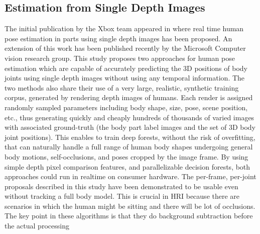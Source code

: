 \subsection{Estimation from Single Depth Images}
 The initial publication by the Xbox\cite{Kinect2014} team appeared in \cite{shotton2013real} where real time human pose estimation in parts using single depth images has been proposed. An extension of this work has been published recently by the Microsoft Computer vision research group\cite{shotton2013efficient}. This study proposes two approaches for human pose estimation which are capable of accurately predicting the 3D positions of body joints using single depth images without using any temporal information. The two methods also share their use of a very large, realistic, synthetic training corpus, generated by rendering depth images of humans. Each render is assigned randomly sampled parameters including body shape, size, pose, scene position, etc., thus generating quickly and cheaply hundreds of thousands of varied images with associated ground-truth (the body part label images and the set of 3D body joint positions). This enables to train deep forests, without the risk of overfitting, that can naturally handle a full range of human body shapes undergoing general body motions, self-occlusions, and poses cropped by the image frame. By using simple depth pixel comparison features, and parallelizable decision forests, both approaches could run in realtime on consumer hardware. The per-frame, per-joint proposals described in this study have been demonstrated to be usable even without tracking a full body model. This is crucial in HRI because there are scenarios in which the human might be sitting and there will be lot of occlusions. The key point in these algorithms is that they do background subtraction before the actual processing 
